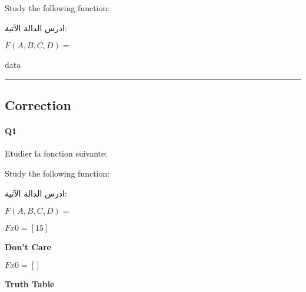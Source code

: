 Study the following function:

\begin{arab}[utf]
ادرس الدالة الآتية:
\end{arab}
$F(A,B,C,D) =$



 


data


\hrule width 1\linewidth
\pagebreak

\subsection{Correction}


\paragraph{Q1}



Etudier la fonction suivante:



Study the following function:

\begin{arab}[utf]
ادرس الدالة الآتية:
\end{arab}
$F(A,B,C,D) =$





$Fx0 = [15]$

\textbf{Don't Care }

$Fx0 = []$



\textbf{Truth Table }



